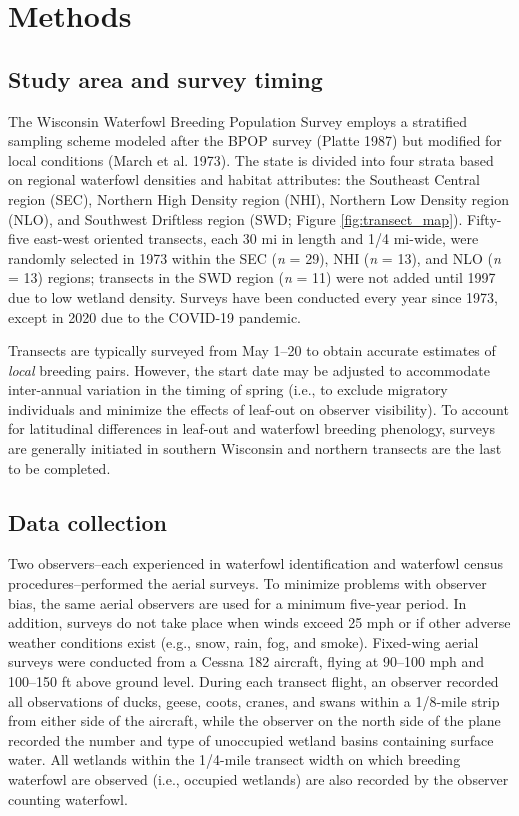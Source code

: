 \documentclass[
  12pt,
]{article}
\begin{document}
\hypertarget{methods}{%
\section{Methods}\label{methods}}

\hypertarget{study-area-and-survey-timing}{%
\subsection{Study area and survey
timing}\label{study-area-and-survey-timing}}

The Wisconsin Waterfowl Breeding Population Survey employs a stratified
sampling scheme modeled after the BPOP survey (Platte 1987) but modified
for local conditions (March et al. 1973). The state is divided into four
strata based on regional waterfowl densities and habitat attributes: the
Southeast Central region (SEC), Northern High Density region (NHI),
Northern Low Density region (NLO), and Southwest Driftless region (SWD;
Figure \ref{fig:transect_map}). Fifty-five east-west oriented transects,
each 30 mi in length and 1/4 mi-wide, were randomly selected in 1973
within the SEC (\emph{n} = 29), NHI (\emph{n} = 13), and NLO (\emph{n} =
13) regions; transects in the SWD region (\emph{n} = 11) were not added
until 1997 due to low wetland density. Surveys have been conducted every
year since 1973, except in 2020 due to the COVID-19 pandemic.

Transects are typically surveyed from May 1--20 to obtain accurate
estimates of \emph{local} breeding pairs. However, the start date may be
adjusted to accommodate inter-annual variation in the timing of spring
(i.e., to exclude migratory individuals and minimize the effects of
leaf-out on observer visibility). To account for latitudinal differences
in leaf-out and waterfowl breeding phenology, surveys are generally
initiated in southern Wisconsin and northern transects are the last to
be completed.

\hypertarget{data-collection}{%
\subsection{Data collection}\label{data-collection}}

Two observers--each experienced in waterfowl identification and
waterfowl census procedures--performed the aerial surveys. To minimize
problems with observer bias, the same aerial observers are used for a
minimum five-year period. In addition, surveys do not take place when
winds exceed 25 mph or if other adverse weather conditions exist (e.g.,
snow, rain, fog, and smoke). Fixed-wing aerial surveys were conducted
from a Cessna 182 aircraft, flying at 90--100 mph and 100--150 ft above
ground level. During each transect flight, an observer recorded all
observations of ducks, geese, coots, cranes, and swans within a 1/8-mile
strip from either side of the aircraft, while the observer on the north
side of the plane recorded the number and type of unoccupied wetland
basins containing surface water. All wetlands within the 1/4-mile
transect width on which breeding waterfowl are observed (i.e., occupied
wetlands) are also recorded by the observer counting waterfowl.
\end{document}
